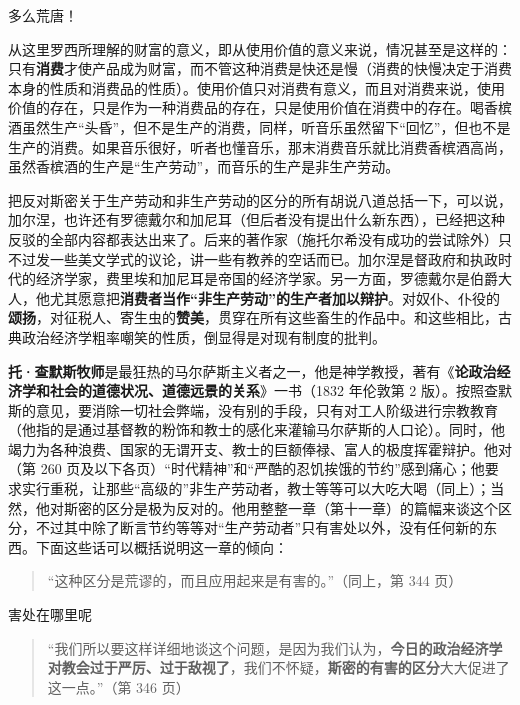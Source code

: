 多么荒唐！

从这里罗西所理解的财富的意义，即从使用价值的意义来说，情况甚至是这样的：只有\textbf{消费}才使产品成为财富，而不管这种消费是快还是慢（消费的快慢决定于消费本身的性质和消费品的性质）。使用价值只对消费有意义，而且对消费来说，使用价值的存在，只是作为一种消费品的存在，只是使用价值在消费中的存在。喝香槟酒虽然生产“头昏”，但不是生产的消费，同样，听音乐虽然留下“回忆”，但也不是生产的消费。如果音乐很好，听者也懂音乐，那末消费音乐就比消费香槟酒高尚，虽然香槟酒的生产是“生产劳动”，而音乐的生产是非生产劳动。


把反对斯密关于生产劳动和非生产劳动的区分的所有胡说八道总括一下，可以说，加尔涅，也许还有罗德戴尔和加尼耳（但后者没有提出什么新东西），已经把这种反驳的全部内容都表达出来了。后来的著作家（施托尔希没有成功的尝试除外）只不过发一些美文学式的议论，讲一些有教养的空话而已。加尔涅是督政府和执政时代的经济学家，费里埃和加尼耳是帝国的经济学家。另一方面，罗德戴尔是伯爵大人，他尤其愿意把\textbf{消费者当作“非生产劳动”的生产者加以辩护}。对奴仆、仆役的\textbf{颂扬}，对征税人、寄生虫的\textbf{赞美}，贯穿在所有这些畜生的作品中。和这些相比，古典政治经济学粗率嘲笑的性质，倒显得是对现有制度的批判。


\textbf{托·查默斯牧师}是最狂热的马尔萨斯主义者之一，他是神学教授，著有《\textbf{论政治经济学和社会的道德状况、道德远景的关系}》一书（1832 年伦敦第 2 版）。按照查默斯的意见，要消除一切社会弊端，没有别的手段，只有对工人阶级进行宗教教育（他指的是通过基督教的粉饰和教士的感化来灌输马尔萨斯的人口论）。同时，他竭力为各种浪费、国家的无谓开支、教士的巨额俸禄、富人的极度挥霍辩护。他对（第 260 页及以下各页）“时代精神”和“严酷的忍饥挨饿的节约”感到痛心；他要求实行重税，让那些“高级的”非生产劳动者，教士等等可以大吃大喝（同上）；当然，他对斯密的区分是极为反对的。他用整整一章（第十一章）的篇幅来谈这个区分，不过其中除了断言节约等等对“生产劳动者”只有害处以外，没有任何新的东西。下面这些话可以概括说明这一章的倾向：

\begin{quote}“这种区分是荒谬的，而且应用起来是有害的。”（同上，第 344 页）\end{quote}

害处在哪里呢

\begin{quote}“我们所以要这样详细地谈这个问题，是因为我们认为，\textbf{今日的政治经济学对教会过于严厉、过于敌视了}，我们不怀疑，\textbf{斯密的有害的区分}大大促进了这一点。”（第 346 页）\end{quote}

